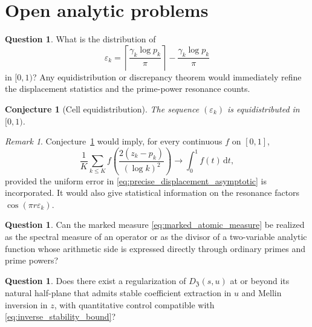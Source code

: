 \documentclass[11pt]{amsart}
\numberwithin{equation}{section}
\theoremstyle{plain}
\newtheorem{conjecture}[theorem]{Conjecture}
\theoremstyle{definition}
\newtheorem{question}[theorem]{Question}
\theoremstyle{remark}
\newtheorem{remark}[theorem]{Remark}
\newcommand{\dd}{\,\mathrm d}
\newcommand{\ZP}{\mathfrak Z}
\begin{document}
\section{Open analytic problems}
\label{sec:open_problems}

\begin{question}
\label{question:epsilon_distribution}
What is the distribution of
\begin{equation}
 \varepsilon_k
 =\left\lceil\frac{\gamma_k\log p_k}{\pi}\right\rceil
 -\frac{\gamma_k\log p_k}{\pi}
 \label{eq:epsilon_open_distribution}
\end{equation}
in $[0,1)$?  Any equidistribution or discrepancy theorem would immediately
refine the displacement statistics and the prime-power resonance counts.
\end{question}

\begin{conjecture}[Cell equidistribution]
\label{conj:cell_equidistribution}
The sequence $(\varepsilon_k)$ is equidistributed in $[0,1)$.
\end{conjecture}

\begin{remark}
\label{rem:conjecture_consequences}
Conjecture~\ref{conj:cell_equidistribution} would imply, for every continuous
$f$ on $[0,1]$,
\begin{equation}
 \frac1K\sum_{k\leq K}
 f\left(\frac{2(z_k-p_k)}{(\log k)^2}\right)
 \longrightarrow\int_0^1f(t)\dd t,
 \label{eq:displacement_distribution_consequence}
\end{equation}
provided the uniform error in
\eqref{eq:precise_displacement_asymptotic} is incorporated.  It would also
give statistical information on the resonance factors
$\cos(\pi r\varepsilon_k)$.
\end{remark}

\begin{question}
\label{question:marked_trace_formula}
Can the marked measure \eqref{eq:marked_atomic_measure} be realized as the
spectral measure of an operator or as the divisor of a two-variable analytic
function whose arithmetic side is expressed directly through ordinary primes
and prime powers?
\end{question}

\begin{question}
\label{question:regularized_recovery}
Does there exist a regularization of $D_{\ZP}(s,u)$ at or beyond its natural
half-plane that admits stable coefficient extraction in $u$ and Mellin
inversion in $z$, with quantitative control compatible with
\eqref{eq:inverse_stability_bound}?
\end{question}
\end{document}
